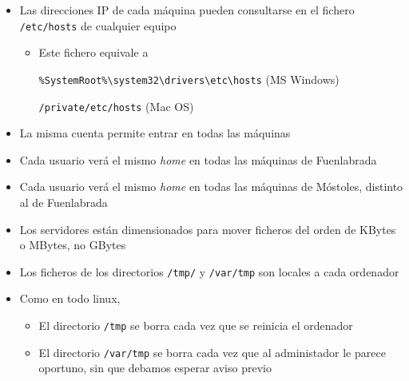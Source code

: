 \documentclass[ucs]{beamer}
\begin{document}
\begin{frame}[fragile]
\begin{itemize}
\item
Las direcciones IP de cada máquina pueden consultarse en el fichero \verb|/etc/hosts| de cualquier equipo

\begin{itemize}
\item
Este fichero equivale a 

\begin{footnotesize}
\verb|%SystemRoot%\system32\drivers\etc\hosts|  (MS Windows)

\verb|/private/etc/hosts|  (Mac OS)

\end{footnotesize}
\end{itemize}

\item
La misma cuenta permite entrar en todas las máquinas
\item
Cada usuario verá el mismo \emph{home} en todas las máquinas de Fuenlabrada
\item
Cada usuario verá el mismo \emph{home} en todas las máquinas de Móstoles, distinto
al de Fuenlabrada
\item
Los servidores están dimensionados para mover ficheros del orden de KBytes o MBytes, no GBytes
\item
Los ficheros de los directorios  \verb|/tmp/| y \verb|/var/tmp| son locales
a cada ordenador
\item
Como en todo linux, 
\begin{itemize}
\item
El directorio \verb|/tmp| se borra cada vez que se reinicia el ordenador
\item
El directorio \verb|/var/tmp| se borra cada vez que al administador le parece oportuno, sin que debamos esperar aviso previo
\end{itemize}


\end{itemize}

\end{frame}
\end{document}
